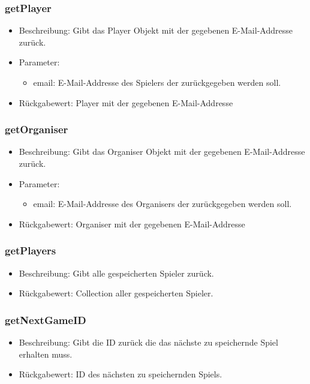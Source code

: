 \documentclass[a4paper]{scrreprt}
\begin{document}
	\subsubsection{getPlayer}
	\begin{itemize}
		\item Beschreibung: Gibt das Player Objekt mit der gegebenen E-Mail-Addresse zurück.
		\item Parameter:
		\begin{itemize}
			\item email: E-Mail-Addresse des Spielers der zurückgegeben werden soll.
		\end{itemize}
		\item Rückgabewert: Player mit der gegebenen E-Mail-Addresse
	\end{itemize}


	\subsubsection{getOrganiser}
	\begin{itemize}
		\item Beschreibung: Gibt das Organiser Objekt mit der gegebenen E-Mail-Addresse zurück.
		\item Parameter:
		\begin{itemize}
			\item email: E-Mail-Addresse des Organisers der zurückgegeben werden soll.
		\end{itemize}
		\item Rückgabewert: Organiser mit der gegebenen E-Mail-Addresse
	\end{itemize}

	\subsubsection{getPlayers}
	\begin{itemize}
		\item Beschreibung: Gibt alle gespeicherten Spieler zurück.
		\item Rückgabewert: Collection aller gespeicherten Spieler.
	\end{itemize}

	\subsubsection{getNextGameID}
	\begin{itemize}
		\item Beschreibung: Gibt die ID zurück die das nächste zu speichernde Spiel erhalten muss.
		\item Rückgabewert: ID des nächsten zu speichernden Spiels.
	\end{itemize}
\end{document}
